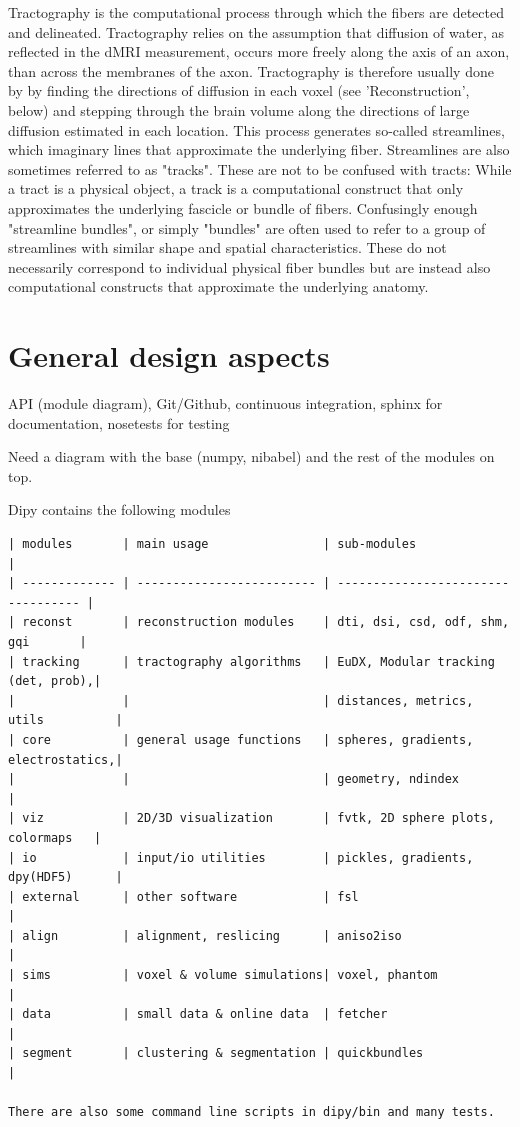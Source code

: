 \documentclass{bioinfo}
\begin{document}
Tractography is the computational process through which the fibers are detected and delineated. Tractography relies on the assumption that diffusion of water, as reflected in the dMRI measurement, occurs more freely along the axis of an axon, than across the membranes of the axon. Tractography is therefore usually done by by finding the directions of diffusion in each voxel (see 'Reconstruction', below) and stepping through the brain volume along the directions of large diffusion estimated in each location. This process generates so-called streamlines, which imaginary lines that approximate the underlying fiber. Streamlines are also sometimes referred to as "tracks". These are not to be confused with tracts: While a tract is a physical object, a track is a computational construct that only approximates the underlying fascicle or bundle of fibers. Confusingly enough "streamline bundles", or simply "bundles" are often used to refer to a group of streamlines with similar shape and spatial characteristics. These do not necessarily correspond to individual physical fiber bundles but are instead also computational constructs that approximate the underlying anatomy.


\section{General design aspects}

API (module diagram), Git/Github, continuous integration, sphinx for documentation, nosetests for testing

Need a diagram with the base (numpy, nibabel) and the rest of the modules on top.

Dipy contains the following modules

\tiny
\begin{verbatim}
| modules       | main usage                | sub-modules                        |
| ------------- | ------------------------- | ---------------------------------- |
| reconst       | reconstruction modules    | dti, dsi, csd, odf, shm, gqi       |
| tracking      | tractography algorithms   | EuDX, Modular tracking (det, prob),|
|               |                           | distances, metrics, utils          |
| core          | general usage functions   | spheres, gradients, electrostatics,|
|               |                           | geometry, ndindex                  |       
| viz           | 2D/3D visualization       | fvtk, 2D sphere plots, colormaps   |
| io            | input/io utilities        | pickles, gradients, dpy(HDF5)      |
| external      | other software            | fsl                                |
| align         | alignment, reslicing      | aniso2iso                          |
| sims          | voxel & volume simulations| voxel, phantom                     |
| data          | small data & online data  | fetcher                            |
| segment       | clustering & segmentation | quickbundles                       |

There are also some command line scripts in dipy/bin and many tests.
\end{verbatim}
\normalsize
\end{document}
